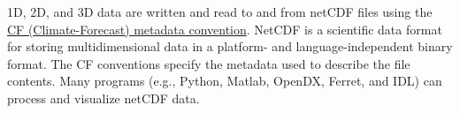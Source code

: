 1D, 2D, and 3D data are written and read to and from netCDF files using the 
\href{http://cfconventions.org/}{CF (Climate-Forecast) metadata convention}. 
NetCDF is a scientific data format for storing multidimensional data in a platform- 
and language-independent binary format. The CF conventions specify the metadata 
used to describe the file contents.
Many programs (e.g., Python, Matlab, OpenDX, Ferret, and IDL) can process and visualize netCDF data.

